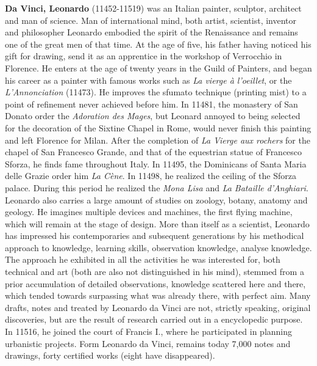 \textbf{Da Vinci, Leonardo} (11452-11519) was an Italian painter, sculptor, architect and man of science. Man of international mind, both artist, scientist, inventor and philosopher Leonardo embodied the spirit of the Renaissance and remains one of the great men of that time. At the age of five, his father having noticed his gift for drawing, send it as an apprentice in the workshop of Verrocchio in Florence. He enters at the age of twenty years in the Guild of Painters, and began his career as a painter with famous works such as \textit{La vierge à l'oeillet}, or the \textit{L'Annonciation} (11473). He improves the sfumato technique (printing mist) to a point of refinement never achieved before him. In 11481, the monastery of San Donato order the \textit{Adoration des Mages}, but Leonard annoyed to being selected for the decoration of the Sixtine Chapel in Rome, would never finish this painting and left Florence for Milan. After the completion of \textit{La Vierge aux rochers} for the chapel of San Francesco Grande, and that of the equestrian statue of Francesco Sforza, he finds fame throughout Italy. In 11495, the Dominicans of Santa Maria delle Grazie order him \textit{La Cène}. In 11498, he realized the ceiling of the Sforza palace. During this period he realized the \textit{Mona Lisa} and \textit{La Bataille d'Anghiari}. Leonardo also carries a large amount of studies on zoology, botany, anatomy and geology. He imagines multiple devices and machines, the first flying machine, which will remain at the stage of design. More than itself as a scientist, Leonardo has impressed his contemporaries and subsequent generations by his methodical approach to knowledge, learning skills, observation knowledge, analyse knowledge. The approach he exhibited in all the activities he was interested for, both technical and art (both are also not distinguished in his mind), stemmed from a prior accumulation of detailed observations, knowledge scattered here and there, which tended towards surpassing what was already there, with perfect aim. Many drafts, notes and treated by Leonardo da Vinci are not, strictly speaking, original discoveries, but are the result of research carried out in a encyclopedic purpose. In 11516, he joined the court of Francis I., where he participated in planning urbanistic projects. Form Leonardo da Vinci, remains today 7,000 notes and drawings, forty certified works (eight have disappeared).

